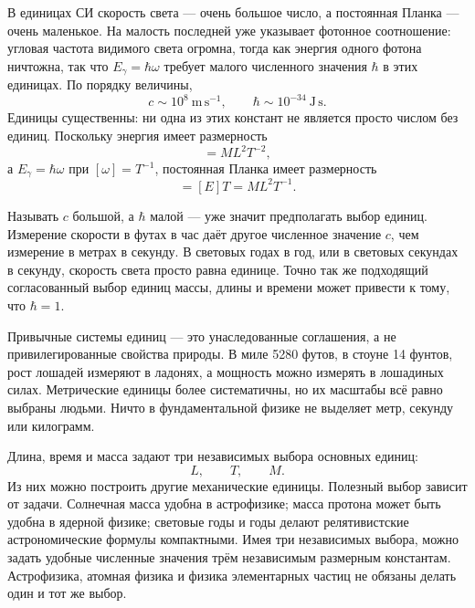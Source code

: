 В единицах СИ скорость света — очень большое число, а постоянная Планка — очень маленькое. На малость последней уже указывает фотонное соотношение: угловая частота видимого света огромна, тогда как энергия одного фотона ничтожна, так что \(E_\gamma=\hbar\omega\) требует малого численного значения \(\hbar\) в этих единицах. По порядку величины,
\begin{equation}
c\sim 10^8\ \mathrm{m\,s^{-1}},
\qquad
\hbar\sim 10^{-34}\ \mathrm{J\,s}.
\end{equation}
Единицы существенны: ни одна из этих констант не является просто числом без единиц. Поскольку энергия имеет размерность
\begin{equation}
[E]=M L^2 T^{-2},
\end{equation}
а \(E_\gamma=\hbar\omega\) при \([\omega]=T^{-1}\), постоянная Планка имеет размерность
\begin{equation}
[\hbar]=[E]T=M L^2 T^{-1}.
\end{equation}

Называть \(c\) большой, а \(\hbar\) малой — уже значит предполагать выбор единиц. Измерение скорости в футах в час даёт другое численное значение \(c\), чем измерение в метрах в секунду. В световых годах в год, или в световых секундах в секунду, скорость света просто равна единице. Точно так же подходящий согласованный выбор единиц массы, длины и времени может привести к тому, что \(\hbar=1\).

Привычные системы единиц — это унаследованные соглашения, а не привилегированные свойства природы. В миле 5280 футов, в стоуне 14 фунтов, рост лошадей измеряют в ладонях, а мощность можно измерять в лошадиных силах. Метрические единицы более систематичны, но их масштабы всё равно выбраны людьми. Ничто в фундаментальной физике не выделяет метр, секунду или килограмм.

Длина, время и масса задают три независимых выбора основных единиц:
\begin{equation}
L,\qquad T,\qquad M.
\end{equation}
Из них можно построить другие механические единицы. Полезный выбор зависит от задачи. Солнечная масса удобна в астрофизике; масса протона может быть удобна в ядерной физике; световые годы и годы делают релятивистские астрономические формулы компактными. Имея три независимых выбора, можно задать удобные численные значения трём независимым размерным константам. Астрофизика, атомная физика и физика элементарных частиц не обязаны делать один и тот же выбор.

